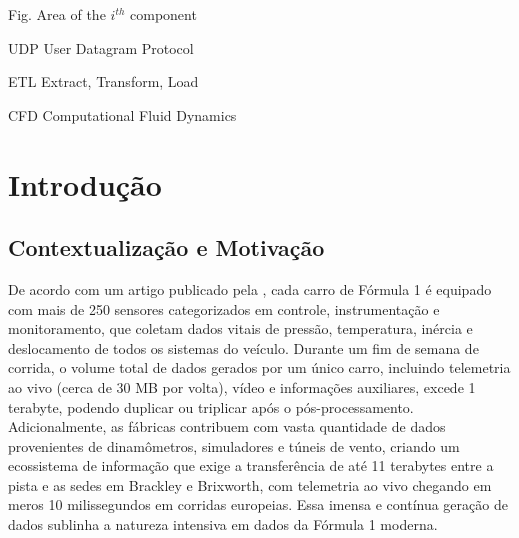 \documentclass[12pt, %
openright, 
oneside, %
a4paper,    %
brazil]{facom-ufu-abntex2}
\begin{document}
\listoftables*
\cleardoublepage



\begin{siglas} %
  \item[Fig.] Area of the $i^{th}$ component
  \item[UDP] User Datagram Protocol
  \item[ETL] Extract, Transform, Load 
  \item[CFD] Computational Fluid Dynamics
\end{siglas}


\tableofcontents*
\cleardoublepage





\textual



\chapter[Introdução]{Introdução}
\section{Contextualização e Motivação}

De acordo com um artigo publicado pela , cada carro de Fórmula 1 é equipado com
mais de 250 sensores categorizados em controle, instrumentação e monitoramento, 
que coletam dados vitais de pressão, temperatura, inércia e deslocamento de todos os 
sistemas do veículo. Durante um fim de semana de corrida, o volume total de dados 
gerados por um único carro, incluindo telemetria ao vivo (cerca de 30 MB por volta), 
vídeo e informações auxiliares, excede 1 terabyte, podendo duplicar ou triplicar após 
o pós-processamento. Adicionalmente, as fábricas contribuem com vasta quantidade de 
dados provenientes de dinamômetros, simuladores e túneis de vento, criando um 
ecossistema de informação que exige a transferência de até 11 terabytes entre a pista 
e as sedes em Brackley e Brixworth, com telemetria ao vivo chegando em meros 10 
milissegundos em corridas europeias. Essa imensa e contínua geração de dados sublinha 
a natureza intensiva em dados da Fórmula 1 moderna.
\end{document}
